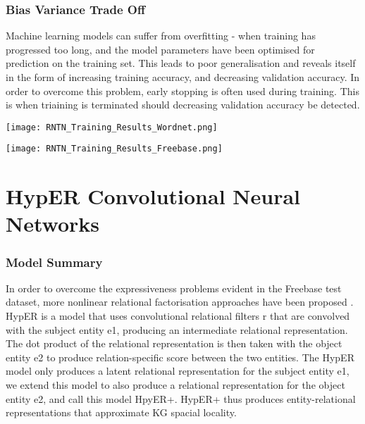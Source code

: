 \subsubsection{Bias Variance Trade Off}
Machine learning models can suffer from overfitting \cite{reference} - when training has progressed too long, and the model parameters have been optimised for prediction on the training set. This leads to poor generalisation  and reveals itself in the form of increasing training accuracy, and decreasing validation accuracy. In order to overcome this problem, early stopping is often used during training. This is when triaining is terminated should decreasing validation accuracy be detected.\newline

\begin{center}
    \texttt{[image: RNTN\_Training\_Results\_Wordnet.png]}
\end{center}

\begin{center}
    \texttt{[image: RNTN\_Training\_Results\_Freebase.png]}
\end{center}

\section{HypER Convolutional Neural Networks}

\subsubsection{Model Summary} 
In order to overcome the expressiveness problems evident in the Freebase test dataset, more nonlinear relational factorisation approaches have been proposed \cite{ComplEx, Neural LP, TorusE}. \newline
HypER is a model that uses convolutional relational filters r that are convolved with the subject entity e1, producing an intermediate relational representation. The dot product of the relational representation is then taken with the object entity e2 to produce relation-specific score between the two entities. The HypER model only produces a latent relational representation for the subject entity e1, we extend this model to also produce a relational representation for the object entity e2, and call this model HpyER+. HypER+ thus produces entity-relational representations that approximate KG spacial locality. \newline
